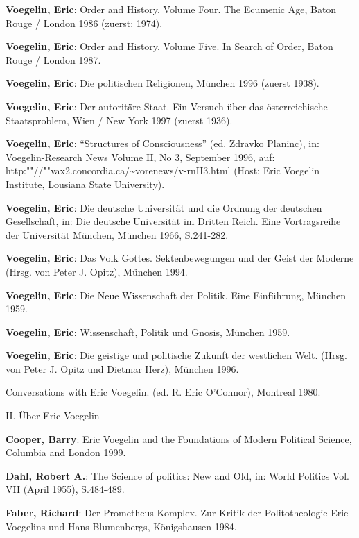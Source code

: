{\bf Voegelin, Eric}: Order and History. Volume Four. The Ecumenic Age, Baton
Rouge / London 1986 (zuerst: 1974).

{\bf Voegelin, Eric}: Order and History. Volume Five. In Search of Order,
Baton Rouge / London 1987.

{\bf Voegelin, Eric}: Die politischen Religionen, München 1996 (zuerst 1938).

{\bf Voegelin, Eric}: Der autoritäre Staat. Ein Versuch über das
österreichische Staatsproblem, Wien / New York 1997 (zuerst 1936).

{\bf Voegelin, Eric}: "`Structures of Consciousness"' (ed. Zdravko Planinc),
in: Voegelin-Research News Volume II, No 3, September 1996, auf:
http:""//""vax2.concordia.ca/\~{ }vorenews/v-rnII3.html (Host: Eric Voegelin
Institute, Lousiana State University).

{\bf Voegelin, Eric}: Die deutsche Universität und die Ordnung der deutschen
Gesellschaft, in: Die deutsche Universität im Dritten Reich. Eine
Vortragsreihe der Universität München, München 1966, S.241-282.

{\bf Voegelin, Eric}: Das Volk Gottes. Sektenbewegungen und der Geist der
Moderne (Hrsg. von Peter J. Opitz), München 1994.

{\bf Voegelin, Eric}: Die Neue Wissenschaft der Politik. Eine Einführung,
München 1959.  %

{\bf Voegelin, Eric}: Wissenschaft, Politik und Gnosis, München 1959.

{\bf Voegelin, Eric}: Die geistige und politische Zukunft der westlichen
Welt. (Hrsg. von Peter J. Opitz und Dietmar Herz), München 1996.

Conversations with Eric Voegelin. (ed. R. Eric O'Connor), Montreal 1980.


\setlength{\parskip}{5ex}

{\large II. Über Eric Voegelin}

\setlength{\parskip}{3ex}

{\bf Cooper, Barry}: Eric Voegelin and the Foundations of Modern Political
Science, Columbia and London 1999.

\setlength{\parskip}{1.5ex}

{\bf Dahl, Robert A.}: The Science of politics: New and Old, in: World
Politics Vol. VII (April 1955), S.484-489.

{\bf Faber, Richard}: Der Prometheus-Komplex. Zur Kritik der Politotheologie
Eric Voegelins und Hans Blumenbergs, Königshausen 1984.

